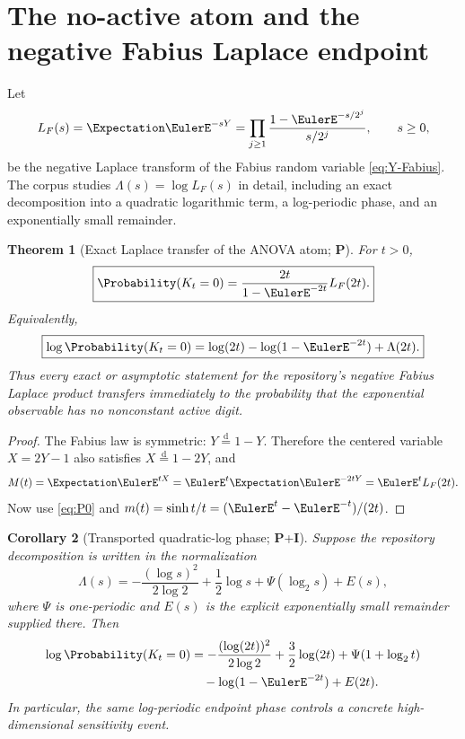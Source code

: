 \documentclass[11pt,oneside]{article}
\newtheorem{theorem}{Theorem}[section]
\newtheorem{corollary}[theorem]{Corollary}
\theoremstyle{definition}
\theoremstyle{remark}
\newcommand{\statusP}{\textcolor{deepgreen}{\textbf{P}}}
\newcommand{\statusI}{\textcolor{deepblue}{\textbf{I}}}
\begin{document}
\section{The no-active atom and the negative Fabius Laplace endpoint}
\label{sec:Laplace-transfer}

Let
\begin{equation}
 L_F(s)=\Expectation\EulerE^{-sY}
 =\prod_{j\ge1}\frac{1-\EulerE^{-s/2^j}}{s/2^j},
 \qquad s\ge0,
 \label{eq:Fabius-Laplace}
\end{equation}
be the negative Laplace transform of the Fabius random variable
\eqref{eq:Y-Fabius}.  The corpus studies
$\Lambda(s)=\log L_F(s)$ in detail, including an exact decomposition into a
quadratic logarithmic term, a log-periodic phase, and an exponentially small
remainder.

\begin{theorem}[Exact Laplace transfer of the ANOVA atom; \statusP]
\label{thm:Laplace-transfer}
For $t>0$,
\begin{equation}
 \boxed{
 \Probability(K_t=0)
 =\frac{2t}{1-\EulerE^{-2t}}L_F(2t).}
 \label{eq:P0-Laplace}
\end{equation}
Equivalently,
\begin{equation}
 \boxed{
 \log\Probability(K_t=0)
 =\log(2t)-\log(1-\EulerE^{-2t})+\Lambda(2t).}
 \label{eq:logP0-Laplace}
\end{equation}
Thus every exact or asymptotic statement for the repository's negative
Fabius Laplace product transfers immediately to the probability that the
exponential observable has no nonconstant active digit.
\end{theorem}

\begin{proof}
The Fabius law is symmetric: $Y\stackrel{\mathrm d}=1-Y$.  Therefore the
centered variable $X=2Y-1$ also satisfies
$X\stackrel{\mathrm d}=1-2Y$, and
\[
 M(t)=\Expectation\EulerE^{tX}=\EulerE^t\Expectation\EulerE^{-2tY}=\EulerE^tL_F(2t).
\]
Now use \eqref{eq:P0} and
$m(t)=\sinh t/t=(\EulerE^t-\EulerE^{-t})/(2t)$.
\end{proof}

\begin{corollary}[Transported quadratic-log phase; \statusP+\statusI]
\label{cor:transported-phase}
Suppose the repository decomposition is written in the normalization
\begin{equation}
 \Lambda(s)=
 -\frac{(\log s)^2}{2\log2}+\frac12\log s
 +\Psi(\log_2s)+E(s),
 \label{eq:repo-Lambda-form}
\end{equation}
where $\Psi$ is one-periodic and $E(s)$ is the explicit exponentially small
remainder supplied there.  Then
\begin{align}
 \log\Probability(K_t=0)
 &=-\frac{(\log(2t))^2}{2\log2}
   +\frac32\log(2t)
   +\Psi(1+\log_2t)\\
 &\quad-\log(1-\EulerE^{-2t})+E(2t).
 \label{eq:P0-transported-asymptotic}
\end{align}
In particular, the same log-periodic endpoint phase controls a concrete
high-dimensional sensitivity event.
\end{corollary}
\end{document}
